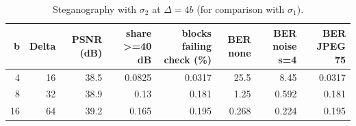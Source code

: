 \begin{table}[htbp]
\caption{Steganography with $\sigma_2$ at $\Delta=4b$ (for comparison with $\sigma_1$).}
\label{tab:stego_sigma2}
\begin{tabular}{rrrrrrrr}
\toprule
b & Delta & PSNR (dB) & share >=40 dB & blocks failing check (\%) & BER none & BER noise s=4 & BER JPEG 75 \\
\midrule
4 & 16 & 38.5 & 0.0825 & 0.0317 & 25.5 & 8.45 & 0.0317 \\
8 & 32 & 38.9 & 0.13 & 0.181 & 1.25 & 0.592 & 0.181 \\
16 & 64 & 39.2 & 0.165 & 0.195 & 0.268 & 0.224 & 0.195 \\
\bottomrule
\end{tabular}
\end{table}
